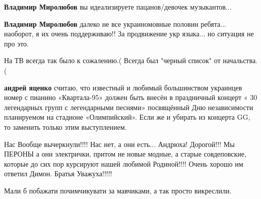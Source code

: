 \begin{itemize}
\begin{itemize}
\textbf{Владимир Миролюбов} вы идеализируете пацанов/девочек музыкантов...

 
\textbf{Владимир Миролюбов} далеко не все украиномовные половин ребята... наоборот, я их очень поддерживаю!! За продвижение укр языка... но ситуация не про это.
\end{itemize}

 

На ТВ всегда так было к сожалению.( Всегда был "черный список" от начальства.(


 
\textbf{андрей яценко} считаю, что известный и любимый большинством украинцев
номер с пианино «Квартала-95» должен быть внесён в праздничный концерт « 30
легендарных групп с легендарными песнями» посвящённый Дню независимости
планируемом на стадионе «Олимпийский». Если же и убирать из концерта GG, то
заменить только этим выступлением.


 

Нас Вообще вычеркнули!!!! Нас нет, а они есть... Андрюха! Дорогой!!! Мы ПЕРОНЫ а
они электрички, притом не новые модные, а старые совдеповские, которые до сих пор
курсируют нашей любимой Родиной!!!! Очень хорошо им ответил Димон. Братья
Уважуха!!!!!

 

Мали б побажати почимчикувати за мавчиками, а так просто викреслили.

\end{itemize}

